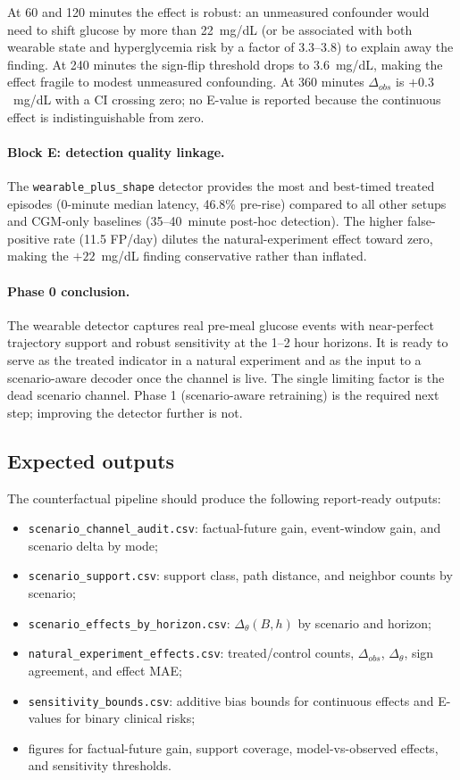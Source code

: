 At 60 and 120 minutes the effect is robust: an unmeasured confounder would need to shift glucose by more than 22~mg/dL (or be associated with both wearable state and hyperglycemia risk by a factor of 3.3--3.8) to explain away the finding. At 240 minutes the sign-flip threshold drops to 3.6~mg/dL, making the effect fragile to modest unmeasured confounding. At 360 minutes $\Delta_{obs}$ is $+0.3$~mg/dL with a CI crossing zero; no E-value is reported because the continuous effect is indistinguishable from zero.

\paragraph{Block E: detection quality linkage.}
The \texttt{wearable\_plus\_shape} detector provides the most and best-timed treated episodes (0-minute median latency, 46.8\% pre-rise) compared to all other setups and CGM-only baselines (35--40~minute post-hoc detection). The higher false-positive rate (11.5 FP/day) dilutes the natural-experiment effect toward zero, making the $+22$~mg/dL finding conservative rather than inflated.

\paragraph{Phase 0 conclusion.}
The wearable detector captures real pre-meal glucose events with near-perfect trajectory support and robust sensitivity at the 1--2 hour horizons. It is ready to serve as the treated indicator in a natural experiment and as the input to a scenario-aware decoder once the channel is live. The single limiting factor is the dead scenario channel. Phase 1 (scenario-aware retraining) is the required next step; improving the detector further is not.

\subsection{Expected outputs}
\label{subsec:cf_expected_outputs}

The counterfactual pipeline should produce the following report-ready outputs:
\begin{itemize}
    \item \texttt{scenario\_channel\_audit.csv}: factual-future gain, event-window gain, and scenario delta by mode;
    \item \texttt{scenario\_support.csv}: support class, path distance, and neighbor counts by scenario;
    \item \texttt{scenario\_effects\_by\_horizon.csv}: $\Delta_\theta(B,h)$ by scenario and horizon;
    \item \texttt{natural\_experiment\_effects.csv}: treated/control counts, $\Delta_{obs}$, $\Delta_\theta$, sign agreement, and effect MAE;
    \item \texttt{sensitivity\_bounds.csv}: additive bias bounds for continuous effects and E-values for binary clinical risks;
    \item figures for factual-future gain, support coverage, model-vs-observed effects, and sensitivity thresholds.
\end{itemize}

